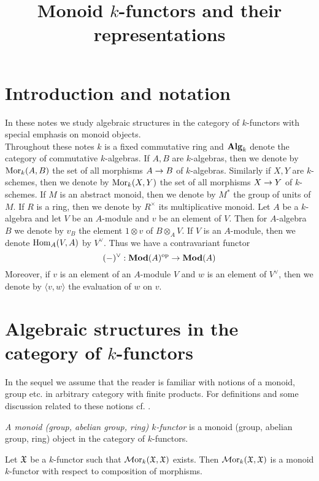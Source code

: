 



\title{Monoid $k$-functors and their representations}
\date{}
\maketitle

\section{Introduction and notation}
\noindent
In these notes we study algebraic structures in the category of $k$-functors with special emphasis on monoid objects.\\
Throughout these notes $k$ is a fixed commutative ring and $\mathbf{Alg}_k$ denote the category of commutative $k$-algebras. If $A, B$ are $k$-algebras, then we denote by $\mathrm{Mor}_k(A, B)$ the set of all morphisms $A\rightarrow B$ of $k$-algebras. Similarly if $X, Y$ are $k$-schemes, then we denote by $\mathrm{Mor}_k(X,Y)$ the set of all morphisms $X\rightarrow Y$ of $k$-schemes. If $M$ is an abstract monoid, then we denote by $M^*$ the group of units of $M$. If $R$ is a ring, then we denote by $R^{\times}$ its multiplicative monoid. Let $A$ be a $k$-algebra and let $V$ be an $A$-module and $v$ be an element of $V$. Then for $A$-algebra $B$ we denote by $v_B$ the element $1\otimes v$ of $B\otimes_AV$. If $V$ is an $A$-module, then we denote $\mathrm{Hom}_A(V,A)$ by $V^{\vee}$. Thus we have a contravariant functor
$$(-)^{\vee}:\mathbf{Mod}(A)^{\mathrm{op}}\rightarrow \mathbf{Mod}(A)$$
Moreover, if $v$ is an element of an $A$-module $V$ and $w$ is an element of $V^{\vee}$, then we denote by $\langle v, w\rangle$ the evaluation of $w$ on $v$. 

\section{Algebraic structures in the category of $k$-functors}
\noindent
In the sequel we assume that the reader is familiar with notions of a monoid, group etc. in arbitrary category with finite products. For definitions and some discussion related to these notions cf. {\cite[pages 2-5]{Maclane}}.

\begin{definition}
\textit{A monoid (group, abelian group, ring) $k$-functor} is a monoid (group, abelian group, ring) object in the category of $k$-functors.
\end{definition}

\begin{example}\label{example:endomorphisms_of_k_functor}
Let ${\mathfrak X}$ be a $k$-functor such that $\mathcal{M}\mathrm{or}_k({\mathfrak X},{\mathfrak X})$ exists. Then $\mathcal{M}\mathrm{or}_k({\mathfrak X},{\mathfrak X})$ is a monoid $k$-functor with respect to composition of morphisms.
\end{example}


